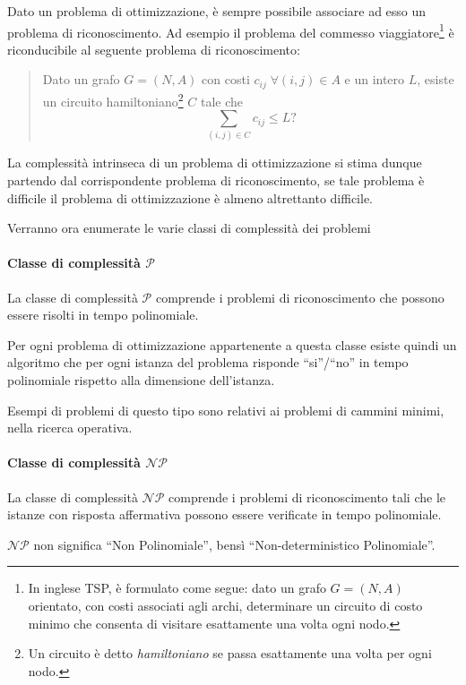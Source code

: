 Dato un problema di ottimizzazione, è sempre possibile associare ad esso un problema di 
riconoscimento. Ad esempio il problema del commesso 
viaggiatore\footnote{In inglese \ac{TSP}, è formulato come segue: dato un grafo $G = 
(N, A)$ orientato, con costi associati agli archi, determinare un circuito di costo 
minimo che consenta di visitare esattamente una volta ogni nodo.} è riconducibile al 
seguente problema di riconoscimento:
\begin{quotation}
Dato un grafo $G = (N, A)$ con costi $c_{ij} \; \forall (i,j) \in A$ e 
un intero $L$, esiste un circuito hamiltoniano\footnote{Un circuito è detto 
\emph{hamiltoniano} se passa esattamente una volta per ogni nodo.} $C$ tale che
\begin{displaymath}
 \sum_{(i,j) \in C}c_{ij} \leq L\text{?}
\end{displaymath}
\end{quotation}
La complessità intrinseca di un problema di ottimizzazione si stima dunque partendo dal 
corrispondente problema di riconoscimento, se tale problema è difficile il problema di 
ottimizzazione è almeno altrettanto difficile.

Verranno ora enumerate le varie classi di complessità dei problemi

\paragraph{Classe di complessità $\mathcal{P}$}
\begin{mydef}
La classe di complessità $\mathcal{P}$ comprende i problemi di riconoscimento che possono 
essere risolti in tempo polinomiale.
\end{mydef}
Per ogni problema di ottimizzazione appartenente a questa classe esiste quindi un 
algoritmo che per ogni istanza del problema risponde ``si''/``no'' in tempo polinomiale 
rispetto alla dimensione dell'istanza.

Esempi di problemi di questo tipo sono relativi ai problemi di cammini minimi, nella 
ricerca operativa.

\paragraph{Classe di complessità $\mathcal{NP}$}
\begin{mydef}
 La classe di complessità $\mathcal{NP}$ comprende i problemi di riconoscimento 
tali che le istanze con risposta affermativa possono essere verificate in tempo 
polinomiale.
\end{mydef}
$\mathcal{NP}$ non significa ``Non Polinomiale'', bensì ``Non-deterministico 
Polinomiale''.

